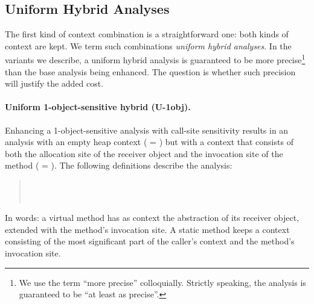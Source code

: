 
\subsection{Uniform Hybrid Analyses}

The first kind of context combination is a straightforward one: both
kinds of context are kept. We term such combinations \emph{uniform
  hybrid analyses}. In the variants we describe, a uniform hybrid
analysis is guaranteed to be more precise\footnote{We use the term
  ``more precise'' colloquially. Strictly speaking, the analysis is
  guaranteed to be ``at least as precise''.} than the base analysis
being enhanced. The question is whether such precision will justify
the added cost.


\paragraph{Uniform 1-object-sensitive hybrid (U-1obj).}

Enhancing a 1-object-sensitive analysis with call-site sensitivity
results in an analysis with an empty heap context ( =
\args{\{$\star$\}}) but with a context that consists of both the
allocation site of the receiver object and the invocation site of the
method ( = ). The following definitions
describe the analysis:
\begin{quote}
 \\
 \\
\end{quote}
In words: a virtual method has as context the abstraction of its
receiver object, extended with the method's invocation site.  A static
method keeps a context consisting of the most significant part of the
caller's context and the method's invocation site.  

